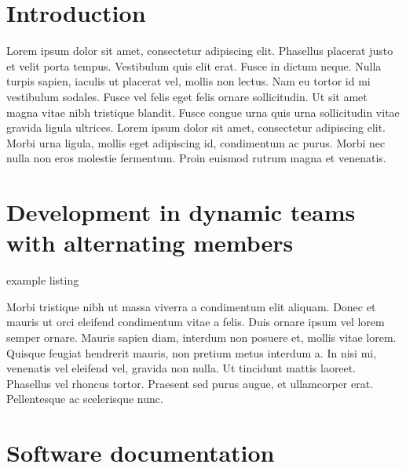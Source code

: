 \section{Introduction}

Lorem ipsum dolor sit amet, consectetur adipiscing elit. Phasellus placerat
justo et velit porta tempus. Vestibulum quis elit erat. Fusce in dictum neque.
Nulla turpis sapien, iaculis ut placerat vel, mollis non lectus. Nam eu tortor
id mi vestibulum sodales. Fusce vel felis eget felis ornare sollicitudin. Ut
sit amet magna vitae nibh tristique blandit. Fusce congue urna quis urna
sollicitudin vitae gravida ligula ultrices. Lorem ipsum dolor sit amet,
consectetur adipiscing elit. Morbi urna ligula, mollis eget adipiscing id,
condimentum ac purus. Morbi nec nulla non eros molestie fermentum. Proin
euismod rutrum magna et venenatis. 


\newpage
\section{Development in dynamic teams with alternating members}

example listing


Morbi tristique nibh ut massa viverra a condimentum elit aliquam. Donec et
mauris ut orci eleifend condimentum vitae a felis. Duis ornare ipsum vel lorem
semper ornare. Mauris sapien diam, interdum non posuere et, mollis vitae
lorem. Quisque feugiat hendrerit mauris, non pretium metus interdum a. In nisi
mi, venenatis vel eleifend vel, gravida non nulla. Ut tincidunt mattis
laoreet. Phasellus vel rhoncus tortor. Praesent sed purus augue, et
ullamcorper erat. Pellentesque ac scelerisque nunc. 


 
\newpage
\section{Software documentation}
\FloatBarrier %



